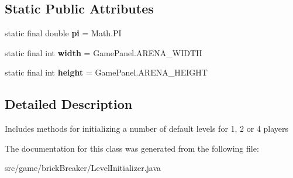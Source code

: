 \subsection*{Static Public Attributes}
\begin{DoxyCompactItemize}
\item 
\hypertarget{classbrick_breaker_1_1_level_initializer_abf93f8503b568500ca05a1c6b7189788}{
static final double {\bfseries pi} = Math.PI}
\label{classbrick_breaker_1_1_level_initializer_abf93f8503b568500ca05a1c6b7189788}

\item 
\hypertarget{classbrick_breaker_1_1_level_initializer_a725f415e02e42e2d8cf49e83ebd245ef}{
static final int {\bfseries width} = GamePanel.ARENA\_\-WIDTH}
\label{classbrick_breaker_1_1_level_initializer_a725f415e02e42e2d8cf49e83ebd245ef}

\item 
\hypertarget{classbrick_breaker_1_1_level_initializer_a7bf5b50b3f52b878e4071b64b75f530e}{
static final int {\bfseries height} = GamePanel.ARENA\_\-HEIGHT}
\label{classbrick_breaker_1_1_level_initializer_a7bf5b50b3f52b878e4071b64b75f530e}

\end{DoxyCompactItemize}


\subsection{Detailed Description}
Includes methods for initializing a number of default levels for 1, 2 or 4 players 

The documentation for this class was generated from the following file:\begin{DoxyCompactItemize}
\item 
src/game/brickBreaker/LevelInitializer.java\end{DoxyCompactItemize}
